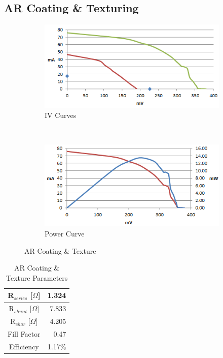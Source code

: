 \documentclass[letter,12pt]{article}
\begin{document}
	\FloatBarrier
	\subsection{AR Coating \& Texturing}
	
		\begin{figure}[h!]
			\centering
			\begin{subfigure}[b]{.45\textwidth}
				\includegraphics[width=\textwidth]{./Images/IV_Curves/Both_IV.png}
				\caption{IV Curves}
			\end{subfigure}
			~
			\begin{subfigure}[b]{.45\textwidth}
				\includegraphics[width=\textwidth]{./Images/IV_Curves/Both_PV.png}
				\caption{Power Curve}
			\end{subfigure}
			
			\caption{AR Coating \& Texture}
			\label{fig:Both}
		\end{figure}
		
		\begin{table}[h!]
			\centering
			\begin{tabular}{|c | r|}
				\hline
				R$_{series}$ [$\Omega$] & 1.324 \\
				\hline
				R$_{shunt}$ [$\Omega$] & 7.833 \\
				\hline
				R$_{char}$ [$\Omega$] & 4.205 \\
				\hline
				Fill Factor & 0.47 \\
				\hline
				Efficiency & 1.17\% \\
				\hline
			\end{tabular}
			\caption{AR Coating \& Texture Parameters}
		\end{table}
		
\end{document}
